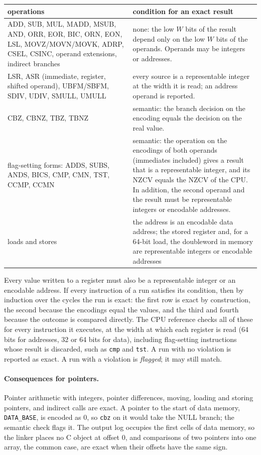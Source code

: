 \documentclass[11pt]{article}
\begin{document}
\begin{center}
\small
\begin{tabularx}{\textwidth}{@{}>{\raggedright\arraybackslash}p{}>{\raggedright\arraybackslash}X@{}}
\toprule
operations & condition for an exact result \\
\midrule
ADD, SUB, MUL, MADD, MSUB, AND, ORR, EOR, BIC, ORN, EON, LSL, MOVZ/MOVN/MOVK, ADRP, CSEL, CSINC, operand extensions, indirect branches &
none: the low $W$ bits of the result depend only on the low $W$ bits of the operands. Operands may be integers or addresses. \\
LSR, ASR (immediate, register, shifted operand), UBFM/SBFM, SDIV, UDIV, SMULL, UMULL &
every source is a representable integer at the width it is read; an address operand is reported. \\
CBZ, CBNZ, TBZ, TBNZ &
semantic: the branch decision on the encoding equals the decision on the real value. \\
flag-setting forms: ADDS, SUBS, ANDS, BICS, CMP, CMN, TST, CCMP, CCMN &
semantic: the operation on the encodings of both operands (immediates included) gives a result that is a
representable integer, and its NZCV equals the NZCV of the CPU. In addition, the second operand and the
result must be representable integers or encodable addresses. \\
loads and stores & the address is an encodable data address; the stored register and, for a 64-bit load,
the doubleword in memory are representable integers or encodable addresses \\
\bottomrule
\end{tabularx}
\end{center}

\noindent Every value written to a register must also be a representable integer or an encodable
address. If every instruction of a run satisfies its condition, then by induction over the cycles
the run is exact: the first row is exact by construction, the second because the encodings equal the
values, and the third and fourth because the outcome is compared directly. The CPU reference checks all
of these for every instruction it executes, at the width at which each register is read (64 bits for
addresses, 32 or 64 bits for data), including flag-setting instructions whose result is discarded,
such as \texttt{cmp} and \texttt{tst}. A run with no violation is reported as exact. A run with a
violation is \emph{flagged}; it may still match.

\paragraph{Consequences for pointers.} Pointer arithmetic with integers, pointer differences, moving,
loading and storing pointers, and indirect calls are exact. A pointer to the start of data memory,
\texttt{DATA\_BASE}, is encoded as 0, so \texttt{cbz} on it would take the NULL branch; the semantic
check flags it. The output log occupies the first cells of data memory, so the linker places no C
object at offset 0, and comparisons of two pointers into one array, the common case, are exact when
their offsets have the same sign.
\end{document}
